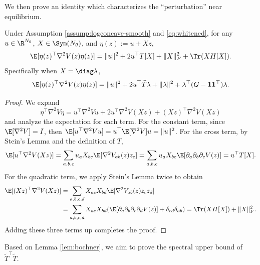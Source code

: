 We then prove an identity which characterizes the ``perturbation'' near equilibrium.

\begin{lemma}\label{lem:bochner}
    Under Assumption \ref{assump:logconcave-smooth} and \eqref{eq:whitened}, for any $u \in \R^{N_\theta}$, $X \in \Sym (N_\theta)$, and $\eta(z) := u + Xz$, 
    \begin{equation*}
        \E[\eta(z)^\top \nabla^2 V(z) \eta (z)] = \|u\|^2 + 2 u^\top T[X] + \|X\|_F^2 + \Tr(X H[X]).
    \end{equation*}
    Specifically when $X = \diag \lambda$,
    \begin{equation*}
        \E[\eta(z)^\top \nabla^2 V(z) \eta (z)] = \|u\|^2 + 2 u^\top \widetilde{T} \lambda + \|\lambda\|^2 + \lambda^\top (G - \mathbf{1} \mathbf{1}^\top) \lambda.
    \end{equation*}
\end{lemma}

\begin{proof}
    We expand 
    \begin{equation*}
        \eta^\top \nabla^2 V \eta = u^\top \nabla^2 V u + 2u^\top \nabla^2 V (Xz) + (Xz)^\top \nabla^2 V (Xz)
    \end{equation*}
    and analyze the expectation for each term.
    For the constant term, since $\E[\nabla^2 V] = I$, then $\E[u^\top \nabla^2 V u] = u^\top \E[\nabla^2 V] u = \|u\|^2$. For the cross term, by Stein's Lemma and the definition of $T$, 
    \begin{equation*}
        \E[u^\top \nabla^2 V (Xz)] = \sum_{a, b, c} u_a X_{bc} \E[\nabla^2 V_{ab} (z) z_c] = \sum_{a, b, c} u_a X_{bc} \E[\partial_a \partial_b \partial_c V (z)] = u^\top T[X].
    \end{equation*}
    For the quadratic term, we apply Stein's Lemma twice to obtain 
    \begin{align*}
        \E[(Xz)^\top \nabla^2 V (Xz)] &= \sum_{a, b, c, d} X_{ac} X_{bd} \E[\nabla^2 V_{ab} (z) z_c z_d] \\
        &= \sum_{a, b, c, d} X_{ac} X_{bd} (\E[\partial_a \partial_b \partial_c \partial_d V (z)] + \delta_{cd} \delta_{ab}) = \Tr(X H[X]) + \|X\|_F^2.
    \end{align*}
    Adding these three terms up completes the proof.
\end{proof}

Based on Lemma \ref{lem:bochner}, we aim to prove the spectral upper bound of $\widetilde{T}^\top \widetilde{T}$.

